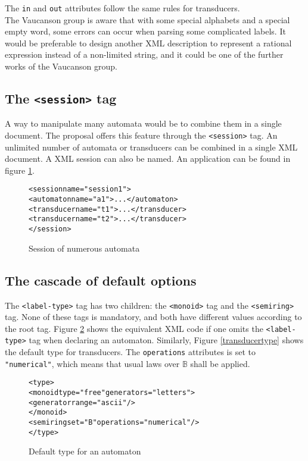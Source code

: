 \documentclass[a4paper]{article}
\newcommand{\Vauc}{{\sc Vaucanson}\xspace}
\def\typetag{\texttt{<label-type>}}
\def\sessiontag{\texttt{<session>}}
\def\monoidtag{\texttt{<monoid>}}
\def\semiringtag{\texttt{<semiring>}}
\begin{document}
The \verb|in| and \verb|out| attributes follow the same rules for transducers.\\
The \Vauc group is aware that with some special alphabets and a special empty
word, some errors can occur when parsing some complicated labels.
It would be preferable to design another XML description to represent a rational
expression instead of a non-limited string, and it could be one of the further
works of the \Vauc{} group.

\subsection{The \sessiontag{} tag}

A way to manipulate many automata would be to combine them in
a single document. The proposal offers this feature through the
\sessiontag{} tag. An unlimited number of automata or transducers
can be combined in a single XML document. A XML session can also be named.
An application can be found in figure \ref{session1}.

{\small

\begin{figure}[h]
  \begin{center}
\begin{alltt}
<session name="session1">
  <automaton name="a1">...</automaton>
  <transducer name="t1">...</transducer>
  <transducer name="t2">...</transducer>
</session>
\end{alltt}

\caption{Session of numerous automata}
\label{session1}
  \end{center}
\end{figure}
}

\subsection{The cascade of default options}

The \typetag{} tag has two children: the \monoidtag{} tag and
the \semiringtag{} tag. None of these tags is mandatory, and both have
different values according to the root tag. Figure
\ref{automatontype} shows the equivalent XML code if one omits the
\typetag{} tag when declaring an automaton. Similarly,
Figure \ref{transducertype} shows the default type for transducers.
The \texttt{operations} attributes is set to \verb|"numerical"|,
which means that usual laws over $\mathbb{B}$ shall be applied.

\begin{figure}[h]
  \begin{center}
\begin{alltt}
<type>
  <monoid type="free" generators="letters">
     <generator range="ascii"/>
  </monoid>
  <semiring set="B" operations="numerical"/>
</type>
\end{alltt}

\caption{Default type for an automaton}
\label{automatontype}
  \end{center}
\end{figure}
\end{document}
